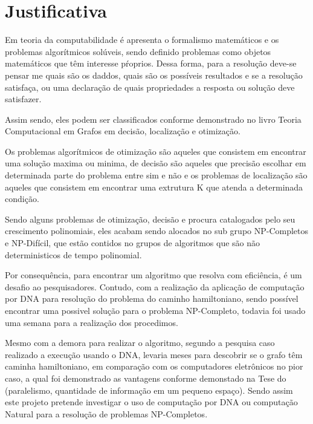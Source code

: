 \section*{Justificativa}
    Em teoria da computabilidade é apresenta o formalismo matemáticos
e os problemas algorítmicos solúveis, sendo definido problemas como
objetos matemáticos que têm interesse pŕoprios. Dessa forma, para a
resolução deve-se pensar me quais são os daddos, quais são os possíveis
resultados e se a resolução satisfaça, ou uma declaração de quais propriedades
a resposta ou solução deve satisfazer\cite{leal_2002_uma}.

    Assim sendo, eles podem ser classificados conforme demonstrado no livro Teoria
Computacional em Grafos em decisão, localização e otimização.
\begin{citacao}
Os problemas algorítmicos de otimização são aqueles que consistem em encontrar uma solução maxima
ou minima, de decisão são aqueles que precisão escolhar em determinada parte do problema entre sim e não
e os problemas de localização são aqueles que consistem em encontrar uma extrutura K que
atenda a determinada condição\citeauthor{szwarcfiter_2018_teoria}.
\end{citacao}
    
    Sendo alguns problemas de otimização, decisão e procura catalogados pelo seu crescimento
polinomiais, eles acabam sendo alocados no sub grupo NP-Completos e NP-Difícil, que estão contidos 
no grupos de algoritmos que são não deterministicos de tempo polinomial\cite{leal_2002_uma}.

    Por consequência, para encontrar um algoritmo que resolva com eficiência, é
um desafio ao pesquisadores. Contudo, com a realização da aplicação de computação por DNA
para resolução do problema do caminho hamiltoniano\cite{adleman_1994_molecular}, sendo possível
encontrar uma possivel solução para o problema NP-Completo, todavia foi usado uma semana
para a realização dos procedimos.

    Mesmo com a demora para realizar o algoritmo, segundo a pesquisa caso realizado a 
execução usando o DNA, levaria meses para descobrir se o grafo têm caminha hamiltoniano,
em comparação com os computadores eletrônicos no pior caso, a qual foi demonstrado as vantagens
conforme demonstado na Tese do \citeauthor{isaiafilho_2004_uma} (paralelismo, quantidade
de informação em um pequeno espaço). Sendo assim este projeto pretende investigar o uso de computação
por DNA ou computação Natural para a resolução de problemas NP-Completos.

